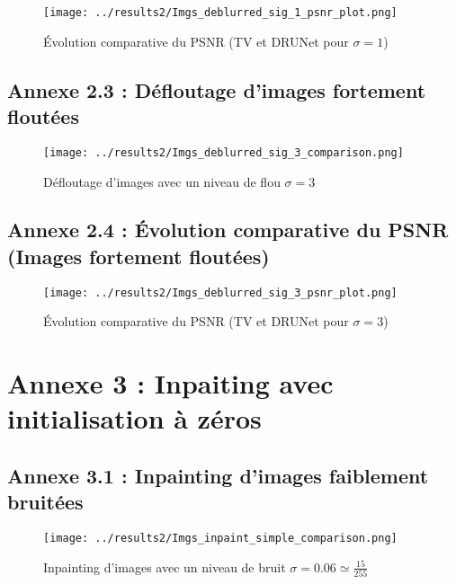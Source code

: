 \documentclass[a4paper, 12pt]{report} %
\begin{document}
\begin{figure}[H]
\centering
\begin{adjustbox}{width=1\linewidth, totalheight=0.5 \textheight, angle=0, scale= 0.72, minipage= 4.2\linewidth, margin= 0}
\texttt{[image: ../results2/Imgs\_deblurred\_sig\_1\_psnr\_plot.png]}
\end{adjustbox}
\caption{Évolution comparative du PSNR (TV et DRUNet pour $\sigma = 1$)}
    \label{fig:25}
\end{figure}

\subsection*{Annexe 2.3 : Défloutage d'images fortement floutées}

\begin{figure}[H]
\centering
\begin{adjustbox}{width=1\linewidth, totalheight=0.5 \textheight, angle=0, scale= 0.72, minipage= 4.2\linewidth, margin= 0}
    \texttt{[image: ../results2/Imgs\_deblurred\_sig\_3\_comparison.png]}
\end{adjustbox}
    \caption{Défloutage d'images avec un niveau de flou $\sigma = 3$}
    \label{fig:26}
\end{figure} 

\subsection*{Annexe 2.4 : Évolution comparative du PSNR (Images fortement floutées)}

\begin{figure}[H]
\centering
\begin{adjustbox}{width=1\linewidth, totalheight=0.5 \textheight, angle=0, scale= 0.72, minipage= 4.2\linewidth, margin= 0}
\texttt{[image: ../results2/Imgs\_deblurred\_sig\_3\_psnr\_plot.png]}
\end{adjustbox}
\caption{Évolution comparative du PSNR (TV et DRUNet pour $\sigma = 3$)}
    \label{fig:27}
\end{figure}

\section*{Annexe 3 : Inpaiting avec initialisation à zéros}
\subsection*{Annexe 3.1 : Inpainting d'images faiblement bruitées}
\begin{figure}[H]
\centering
\begin{adjustbox}{width=1\linewidth, totalheight=0.48 \textheight, angle=0, scale= 0.72, minipage= 4.2\linewidth, margin= 0}
    \texttt{[image: ../results2/Imgs\_inpaint\_simple\_comparison.png]}
\end{adjustbox}
    \caption{Inpainting d'images avec un niveau de bruit $\sigma = 0.06 \simeq \frac{15}{255}$}
    \label{fig:28}
\end{figure} 
\end{document}
